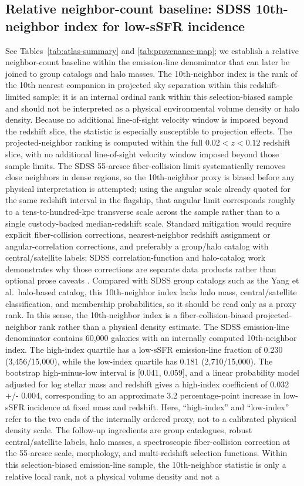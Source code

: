 \documentclass[twocolumn]{aastex631}
\begin{document}
\subsection{Relative neighbor-count baseline: SDSS 10th-neighbor index for low-sSFR incidence}
See Tables~\ref{tab:atlas-summary} and \ref{tab:provenance-map}; we establish a relative neighbor-count baseline within the emission-line denominator that can later be joined to group catalogs and halo masses. The 10th-neighbor index is the rank of the 10th nearest companion in projected sky separation within this redshift-limited sample; it is an internal ordinal rank within this selection-biased sample and should not be interpreted as a physical environmental volume density or halo density. Because no additional line-of-sight velocity window is imposed beyond the redshift slice, the statistic is especially susceptible to projection effects. The projected-neighbor ranking is computed within the full $0.02<z<0.12$ redshift slice, with no additional line-of-sight velocity window imposed beyond those sample limits. The SDSS 55-arcsec fiber-collision limit systematically removes close neighbors in dense regions, so the 10th-neighbor proxy is biased before any physical interpretation is attempted; using the angular scale already quoted for the same redshift interval in the flagship, that angular limit corresponds roughly to a tens-to-hundred-kpc transverse scale across the sample rather than to a single custody-backed median-redshift scale. Standard mitigation would require explicit fiber-collision corrections, nearest-neighbor redshift assignment or angular-correlation corrections, and preferably a group/halo catalog with central/satellite labels; SDSS correlation-function and halo-catalog work demonstrates why those corrections are separate data products rather than optional prose caveats \citep{zehavi2002,blanton2003,guo2012,yang2007}. Compared with SDSS group catalogs such as the Yang et al.\ halo-based catalog, this 10th-neighbor index lacks halo mass, central/satellite classification, and membership probabilities, so it should be read only as a proxy rank. In this sense, the 10th-neighbor index is a fiber-collision-biased projected-neighbor rank rather than a physical density estimate. The SDSS emission-line denominator contains 60,000 galaxies with an internally computed 10th-neighbor index. The high-index quartile has a low-sSFR emission-line fraction of 0.230 (3,456/15,000), while the low-index quartile has 0.181 (2,710/15,000). The bootstrap high-minus-low interval is [0.041, 0.059], and a linear probability model adjusted for log stellar mass and redshift gives a high-index coefficient of 0.032 +/- 0.004, corresponding to an approximate 3.2 percentage-point increase in low-sSFR incidence at fixed mass and redshift. Here, ``high-index'' and ``low-index'' refer to the two ends of the internally ordered proxy, not to a calibrated physical density scale. The follow-up ingredients are group catalogues, robust central/satellite labels, halo masses, a spectroscopic fiber-collision correction at the 55-arcsec scale, morphology, and multi-redshift selection functions. Within this selection-biased emission-line sample, the 10th-neighbor statistic is only a relative local rank, not a physical volume density and not a 
\end{document}
